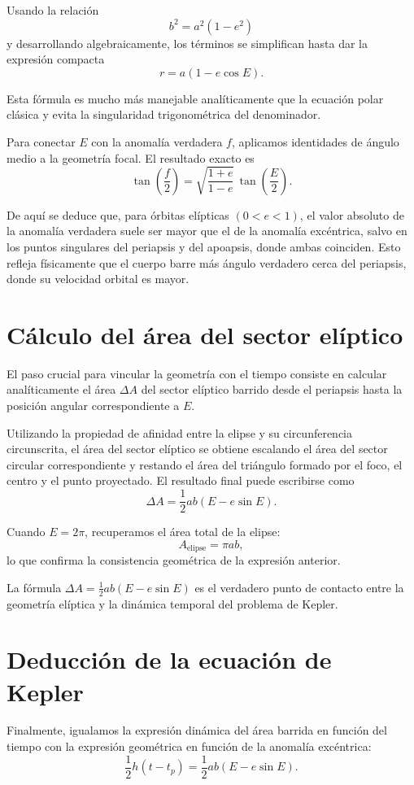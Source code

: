 Usando la relación
\[
 b^2 = a^2(1-e^2)
\]
y desarrollando algebraicamente, los términos se simplifican hasta dar la expresión compacta
\[
 r = a(1-e\cos E).
\]

Esta fórmula es mucho más manejable analíticamente que la ecuación polar clásica y evita la singularidad trigonométrica del denominador.

Para conectar \(E\) con la anomalía verdadera \(f\), aplicamos identidades de ángulo medio a la geometría focal. El resultado exacto es
\[
 \tan\left(\frac{f}{2}\right) = \sqrt{\frac{1+e}{1-e}}\,\tan\left(\frac{E}{2}\right).
\]

De aquí se deduce que, para órbitas elípticas \((0<e<1)\), el valor absoluto de la anomalía verdadera suele ser mayor que el de la anomalía excéntrica, salvo en los puntos singulares del periapsis y del apoapsis, donde ambas coinciden. Esto refleja físicamente que el cuerpo barre más ángulo verdadero cerca del periapsis, donde su velocidad orbital es mayor.

\section{Cálculo del área del sector elíptico}
El paso crucial para vincular la geometría con el tiempo consiste en calcular analíticamente el área \(\Delta A\) del sector elíptico barrido desde el periapsis hasta la posición angular correspondiente a \(E\).

Utilizando la propiedad de afinidad entre la elipse y su circunferencia circunscrita, el área del sector elíptico se obtiene escalando el área del sector circular correspondiente y restando el área del triángulo formado por el foco, el centro y el punto proyectado. El resultado final puede escribirse como
\[
 \Delta A = \frac{1}{2}ab(E-e\sin E).
\]

Cuando \(E = 2\pi\), recuperamos el área total de la elipse:
\[
 A_{\text{elipse}} = \pi ab,
\]
lo que confirma la consistencia geométrica de la expresión anterior.

\begin{importante}
La fórmula \(\Delta A = \frac{1}{2}ab(E-e\sin E)\) es el verdadero punto de contacto entre la geometría elíptica y la dinámica temporal del problema de Kepler.
\end{importante}

\section{Deducción de la ecuación de Kepler}
Finalmente, igualamos la expresión dinámica del área barrida en función del tiempo con la expresión geométrica en función de la anomalía excéntrica:
\[
 \frac{1}{2}h(t-t_p) = \frac{1}{2}ab(E-e\sin E).
\]

